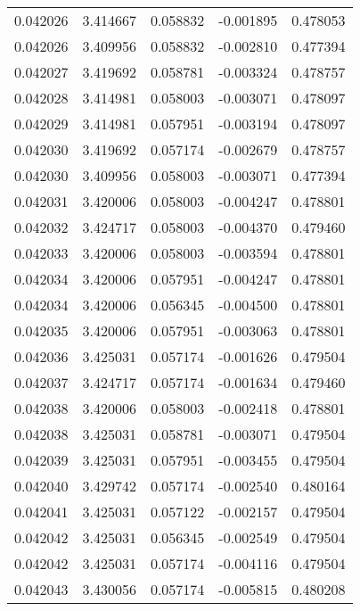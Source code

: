 \begin{tabular}{lrrrr}
0.042026    &  3.414667 &  0.058832 & -0.001895 &             0.478053 \\
0.042026    &  3.409956 &  0.058832 & -0.002810 &             0.477394 \\
0.042027    &  3.419692 &  0.058781 & -0.003324 &             0.478757 \\
0.042028    &  3.414981 &  0.058003 & -0.003071 &             0.478097 \\
0.042029    &  3.414981 &  0.057951 & -0.003194 &             0.478097 \\
0.042030    &  3.419692 &  0.057174 & -0.002679 &             0.478757 \\
0.042030    &  3.409956 &  0.058003 & -0.003071 &             0.477394 \\
0.042031    &  3.420006 &  0.058003 & -0.004247 &             0.478801 \\
0.042032    &  3.424717 &  0.058003 & -0.004370 &             0.479460 \\
0.042033    &  3.420006 &  0.058003 & -0.003594 &             0.478801 \\
0.042034    &  3.420006 &  0.057951 & -0.004247 &             0.478801 \\
0.042034    &  3.420006 &  0.056345 & -0.004500 &             0.478801 \\
0.042035    &  3.420006 &  0.057951 & -0.003063 &             0.478801 \\
0.042036    &  3.425031 &  0.057174 & -0.001626 &             0.479504 \\
0.042037    &  3.424717 &  0.057174 & -0.001634 &             0.479460 \\
0.042038    &  3.420006 &  0.058003 & -0.002418 &             0.478801 \\
0.042038    &  3.425031 &  0.058781 & -0.003071 &             0.479504 \\
0.042039    &  3.425031 &  0.057951 & -0.003455 &             0.479504 \\
0.042040    &  3.429742 &  0.057174 & -0.002540 &             0.480164 \\
0.042041    &  3.425031 &  0.057122 & -0.002157 &             0.479504 \\
0.042042    &  3.425031 &  0.056345 & -0.002549 &             0.479504 \\
0.042042    &  3.425031 &  0.057174 & -0.004116 &             0.479504 \\
0.042043    &  3.430056 &  0.057174 & -0.005815 &             0.480208 \\

\end{tabular}
